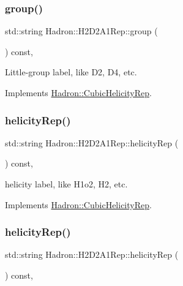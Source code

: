 \subsubsection{\texorpdfstring{group()}{group()}\hspace{0.1cm}{\footnotesize\ttfamily [5/5]}}
{\footnotesize\ttfamily std\+::string Hadron\+::\+H2\+D2\+A1\+Rep\+::group (\begin{DoxyParamCaption}{ }\end{DoxyParamCaption}) const\hspace{0.3cm}{\ttfamily [inline]}, {\ttfamily [virtual]}}

Little-\/group label, like D2, D4, etc. 

Implements \mbox{\hyperlink{structHadron_1_1CubicHelicityRep_a101a7d76cd8ccdad0f272db44b766113}{Hadron\+::\+Cubic\+Helicity\+Rep}}.

\mbox{\label{structHadron_1_1H2D2A1Rep_a53e9f8aa22d8ccbeb585c9cf56440392}} 
\subsubsection{\texorpdfstring{helicityRep()}{helicityRep()}\hspace{0.1cm}{\footnotesize\ttfamily [1/3]}}
{\footnotesize\ttfamily std\+::string Hadron\+::\+H2\+D2\+A1\+Rep\+::helicity\+Rep (\begin{DoxyParamCaption}{ }\end{DoxyParamCaption}) const\hspace{0.3cm}{\ttfamily [inline]}, {\ttfamily [virtual]}}

helicity label, like H1o2, H2, etc. 

Implements \mbox{\hyperlink{structHadron_1_1CubicHelicityRep_af1096946b7470edf0a55451cc662f231}{Hadron\+::\+Cubic\+Helicity\+Rep}}.

\mbox{\label{structHadron_1_1H2D2A1Rep_a53e9f8aa22d8ccbeb585c9cf56440392}} 
\subsubsection{\texorpdfstring{helicityRep()}{helicityRep()}\hspace{0.1cm}{\footnotesize\ttfamily [2/3]}}
{\footnotesize\ttfamily std\+::string Hadron\+::\+H2\+D2\+A1\+Rep\+::helicity\+Rep (\begin{DoxyParamCaption}{ }\end{DoxyParamCaption}) const\hspace{0.3cm}{\ttfamily [inline]}, {\ttfamily [virtual]}}

